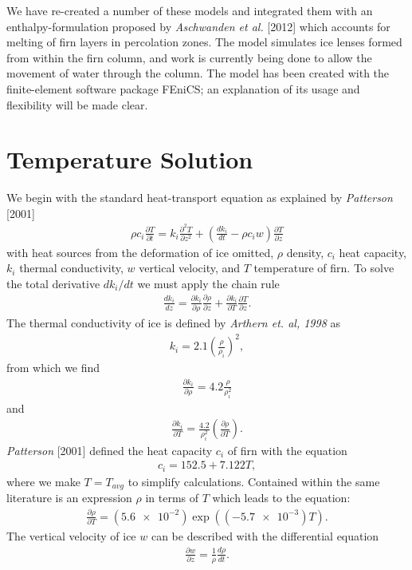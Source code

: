 \documentclass{article}%
\begin{document}
We have re-created a number of these models and integrated them with an enthalpy-formulation proposed by \emph{Aschwanden et al.} [2012] which accounts for melting of firn layers in percolation zones.  The model simulates ice lenses formed from within the firn column, and work is currently being done to allow the movement of water through the column.  The model has been created with the finite-element software package FEniCS; an explanation of its usage and flexibility will be made clear.

\section{Temperature Solution}

We begin with the standard heat-transport equation as explained by \emph{Patterson} [2001]
\begin{align*}
  \rho c_i \frac{\partial T}{\partial t} = 
    k_i \frac{\partial^2 T}{\partial z^2} +
    \left( \frac{dk_i}{dt} - \rho c_i w \right) \frac{\partial T}{\partial z}
\end{align*}
with heat sources from the deformation of ice omitted, $\rho$ density, $c_i$ heat capacity, $k_i$ thermal conductivity, $w$ vertical velocity, and $T$ temperature of firn.  To solve the total derivative $dk_i/dt$ we must apply the chain rule
\begin{align*}
  \frac{dk_i}{dz} = 
  \frac{\partial k_i}{\partial \rho} \frac{\partial \rho}{\partial z} + 
  \frac{\partial k_i}{\partial T} \frac{\partial T}{\partial z}.
\end{align*}
The thermal conductivity of ice is defined by \emph{Arthern et. al, 1998} as
\begin{align*}
  k_i = 2.1 \left(\frac{\rho}{\rho_i}\right)^2,
\end{align*}
from which we find
\begin{align*}
  \frac{\partial k_i}{\partial \rho} = 
    4.2 \frac{\rho}{\rho_i^2}
\end{align*}
and
\begin{align*}
  \frac{\partial k_i}{\partial T} = 
    \frac{4.2}{\rho_i^2} \left( \frac{\partial \rho}{\partial T} \right).
\end{align*}
\emph{Patterson} [2001] defined the heat capacity $c_i$ of firn with the equation
\begin{align*}
  c_i = 152.5 + 7.122 T,
\end{align*}
where we make $T=T_{avg}$ to simplify calculations.  Contained within the same literature is an expression $\rho$ in terms of $T$ which leads to the equation:
\begin{align*}
  \frac{\partial \rho}{\partial T} = 
    (\SI{5.6e-2}) \exp ((\SI{-5.7e-3})T).
\end{align*}
The vertical velocity of ice $w$ can be described with the differential equation
\begin{align*}
  \frac{\partial w}{\partial z} = \frac{1}{\rho} \frac{d \rho}{dt}.
\end{align*}
\end{document}
